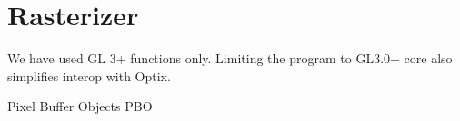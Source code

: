 \part{Rasterizer}

We have used GL 3+ functions only. Limiting the program to GL3.0+ core also simplifies interop with Optix.

Pixel Buffer Objects PBO